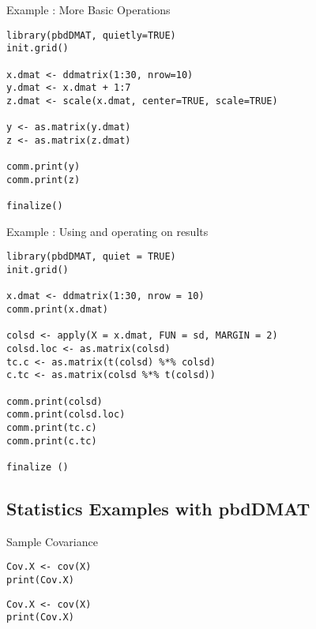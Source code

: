 \begin{frame}[fragile]
  \begin{exampleblock}{Example \countex:  More Basic Operations}\pause
    \begin{lstlisting}[title=4\_misc.r]
library(pbdDMAT, quietly=TRUE)
init.grid()

x.dmat <- ddmatrix(1:30, nrow=10)
y.dmat <- x.dmat + 1:7
z.dmat <- scale(x.dmat, center=TRUE, scale=TRUE)

y <- as.matrix(y.dmat)
z <- as.matrix(z.dmat)

comm.print(y)
comm.print(z)

finalize()
    \end{lstlisting}
  \end{exampleblock}
\end{frame}

\begin{frame}[fragile]
  \begin{exampleblock}{Example \countex:  Using  and
      operating on results}\pause
    \begin{lstlisting}[title=5\_misc.r]
library(pbdDMAT, quiet = TRUE)
init.grid()

x.dmat <- ddmatrix(1:30, nrow = 10)
comm.print(x.dmat)

colsd <- apply(X = x.dmat, FUN = sd, MARGIN = 2)
colsd.loc <- as.matrix(colsd)
tc.c <- as.matrix(t(colsd) %*% colsd)
c.tc <- as.matrix(colsd %*% t(colsd))

comm.print(colsd)
comm.print(colsd.loc)
comm.print(tc.c)
comm.print(c.tc)

finalize ()
    \end{lstlisting}
  \end{exampleblock}
\end{frame}

\subsection{Statistics Examples with pbdDMAT}
\makesubcontentsslidessec

\begin{frame}[fragile]
  \begin{exampleblock}{Sample Covariance}\pause
\begin{lstlisting}[title=Serial Code]
Cov.X <- cov(X)
print(Cov.X)
\end{lstlisting}

\begin{lstlisting}[title=Parallel Code]
Cov.X <- cov(X)
print(Cov.X)
\end{lstlisting}
  \end{exampleblock}
\end{frame}

